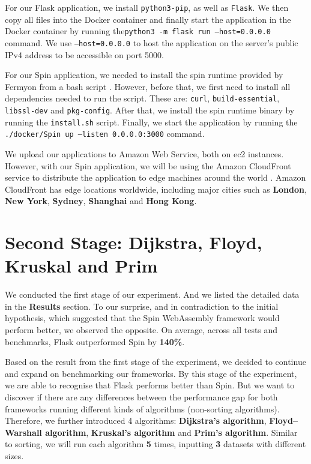 For our Flask application, we install \texttt{python3-pip}, as well as \texttt{Flask}. We then copy all files into the Docker container and finally start the application in the Docker container by running the\newline\texttt{python3 -m flask run --host=0.0.0.0} command. We use \texttt{--host=0.0.0.0} to host the application on the server's public IPv4 address to be accessible on port 5000.

For our Spin application, we needed to install the spin runtime provided by Fermyon from a bash script \cite{exp56}. However, before that, we first need to install all dependencies needed to run the script. These are: \texttt{curl}, \texttt{build-essential}, \texttt{libssl-dev} and \texttt{pkg-config}. After that, we install the spin runtime binary by running the \texttt{install.sh} script. Finally, we start the application by running the \newline\texttt{./docker/Spin up --listen 0.0.0.0:3000} command.

We upload our applications to Amazon Web Service, both on ec2 instances. However, with our Spin application, we will be using the Amazon CloudFront service to distribute the application to edge machines around the world \cite{exp57}. Amazon CloudFront has edge locations worldwide, including major cities such as \textbf{London}, \textbf{New York}, \textbf{Sydney}, \textbf{Shanghai} and \textbf{Hong Kong}.

\bigskip
\section{Second Stage: Dijkstra, Floyd, Kruskal and Prim}

We conducted the first stage of our experiment. And we listed the detailed data in the \textbf{Results} section. To our surprise, and in contradiction to the initial hypothesis, which suggested that the Spin WebAssembly framework would perform better, we observed the opposite. On average, across all tests and benchmarks, Flask outperformed Spin by \textbf{140\%}.

Based on the result from the first stage of the experiment, we decided to continue and expand on benchmarking our frameworks. By this stage of the experiment, we are able to recognise that Flask performs better than Spin. But we want to discover if there are any differences between the performance gap for both frameworks running different kinds of algorithms (non-sorting algorithms). Therefore, we further introduced 4 algorithms: \textbf{Dijkstra's algorithm}, \textbf{Floyd–Warshall algorithm}, \textbf{Kruskal's algorithm} and \textbf{Prim's algorithm}. Similar to sorting, we will run each algorithm \textbf{5} times, inputting \textbf{3} datasets with different sizes.

